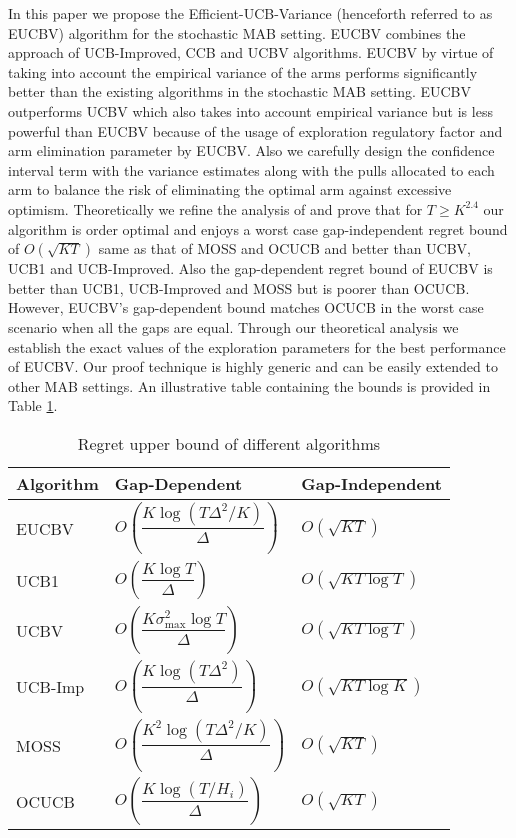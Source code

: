 In this paper we propose the Efficient-UCB-Variance (henceforth referred to as EUCBV) algorithm for the stochastic MAB setting. EUCBV combines the approach of UCB-Improved, CCB \cite{liu2016modification} and UCBV algorithms. EUCBV by virtue of taking into account the empirical variance of the arms performs significantly better than the existing algorithms in the stochastic MAB setting. EUCBV outperforms UCBV \cite{audibert2009exploration} which also takes into account empirical variance but is less powerful than EUCBV because of the usage of exploration regulatory factor and arm elimination parameter by EUCBV. Also we carefully design the confidence interval term with the variance estimates along with the pulls allocated to each arm to balance the risk of eliminating the optimal arm against excessive optimism.   Theoretically we refine the analysis of \cite{auer2010ucb} and prove that for $T\geq K^{2.4}$ our algorithm is order optimal and enjoys a worst case gap-independent regret bound of $O\left( \sqrt{KT} \right)$ same as that of MOSS and OCUCB and better than UCBV, UCB1 and UCB-Improved. Also the gap-dependent regret bound of EUCBV is better than UCB1, UCB-Improved and MOSS but is poorer than OCUCB. However, EUCBV's gap-dependent bound matches OCUCB in the worst case scenario when all the gaps are equal. Through our theoretical analysis we establish the exact values of the exploration parameters for the best performance of EUCBV. Our proof technique is highly generic and can be easily extended to other MAB settings. An illustrative table containing the bounds is provided in Table \ref{tab:comp-bds}. 


\begin{table}
\caption{Regret upper bound of different algorithms}
\label{tab:comp-bds}
\begin{center}
\begin{tabular}{p{6em}p{12em}p{10em}}
\toprule
Algorithm  & Gap-Dependent & Gap-Independent \\
\hline
EUCBV		& $O\left( \dfrac{K\log (T\Delta^2 /K)}{\Delta}\right)$ & $O\left(\sqrt{KT}\right)$\\
UCB1        & $O\left( \dfrac{K\log T}{\Delta} \right)$ & $O\left(\sqrt{KT\log T}\right)$ \\%
UCBV        & $O\left( \dfrac{K\sigma_{\max}^{2}\log T}{\Delta} \right)$ & $O\left(\sqrt{KT\log T}\right)$ \\
UCB-Imp 		& $O\left( \dfrac{K\log (T\Delta^2)}{\Delta} \right)$ & $O\left(\sqrt{KT\log K}\right)$ \\%
MOSS	     	& $O\left( \dfrac{K^2\log (T\Delta^2 /K)}{\Delta}\right)$ & $O\left(\sqrt{KT}\right)$\\%
OCUCB     	& $O\left( \dfrac{K\log (T/ H_{i})}{\Delta}\right)$ & $O\left(\sqrt{KT}\right)$\\\midrule
\end{tabular}
\end{center}
\vspace*{-2em}
\end{table}


